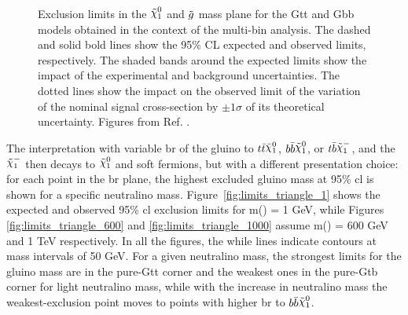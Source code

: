 \begin{figure}[htbp]
	\centering 
	\caption{Exclusion limits in the $\ninoone$ and $\tilde{g}$ mass plane
  		for the  Gtt and   Gbb models obtained
		in the context of the multi-bin analysis. The dashed and solid bold lines
		show the 95\% CL expected and observed limits, respectively. The
  		shaded bands around the expected limits show the
                impact of the
  		experimental and background uncertainties. The dotted
  		lines show the impact on the observed limit of the variation of the
  		nominal signal cross-section by $\pm 1 \sigma$ of its theoretical
  		uncertainty. 
  		Figures from Ref. \cite{ATLAS-CONF-2018-041}.	
      }
	\label{fig:limits_GbbGtt_R21}
\end{figure}

The interpretation with variable \gls{br} of the gluino to $ t \bar{t} \ninoone$, $ b \bar{b} \ninoone$, 
or $t \bar{b} \chinoonem$, and the $\chinoonem$ then decays to $\ninoone$ and soft fermions, but with a different 
presentation choice: for each point in the \gls{br} plane, the highest excluded gluino mass at 95\% \gls{cl}
is shown for a specific neutralino mass. 
Figure~\ref{fig:limits_triangle_1} shows the expected and observed 95\%
\gls{cl} exclusion limits for m(\ninoone) = 1 GeV, while Figures \ref{fig:limits_triangle_600} and \ref{fig:limits_triangle_1000} assume 
m(\ninoone) = 600 GeV and 1 TeV respectively. 
In all the figures, the while lines indicate contours at mass intervals of 50 GeV. 
For a given neutralino mass, the strongest limits for the gluino mass are in the pure-Gtt corner and the weakest ones in the 
pure-Gtb corner for light neutralino mass, while with the increase in neutralino mass the weakest-exclusion point 
moves to points with higher \gls{br} to $ b \bar{b} \ninoone$.


